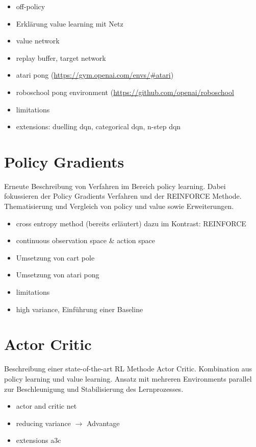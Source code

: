 \documentclass[11pt]{scrartcl}
\begin{document}
\begin{itemize}
\itemsep0pt
\item off-policy
\item Erklärung value learning mit Netz
\item value network
\item replay buffer, target network
\item atari pong (\url{https://gym.openai.com/envs/#atari})
\item roboschool pong environment (\url{https://github.com/openai/roboschool}
\item limitations
\item extensions: duelling dqn, categorical dqn, n-step dqn
\end{itemize}

\newpage
\section{Policy Gradients}
Erneute Beschreibung von Verfahren im Bereich policy learning. Dabei fokussieren der
Policy Gradients Verfahren und der REINFORCE Methode. Thematisierung und Vergleich von
policy und value sowie Erweiterungen.
\begin{itemize}
\itemsep0pt
\item cross entropy method (bereits erläutert) dazu im Kontrast: REINFORCE
\item continuous observation space \& action space
\item Umsetzung von cart pole
\item Umsetzung von atari pong
\item limitations
\item high variance, Einführung einer Baseline
\end{itemize}

\newpage
\section{Actor Critic}
Beschreibung einer state-of-the-art RL Methode Actor Critic. Kombination aus policy learning und value learning. Ansatz mit mehreren Environments parallel zur Beschleunigung und Stabilisierung des Lernprozesses.
\begin{itemize}
\itemsep0pt
\item actor and critic net
\item reducing variance $\rightarrow$ Advantage
\item extensions a3c
\end{itemize}
\end{document}
